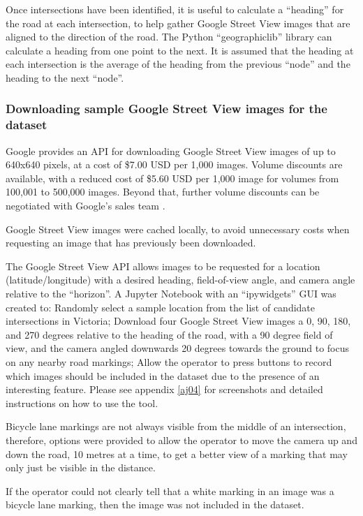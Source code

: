 \documentclass[11pt,twoside]{report}
\begin{document}
Once intersections have been identified, it is useful to calculate a ``heading'' for the road at each intersection, to help gather Google Street View images that are aligned to the direction of the road.  The Python ``geographiclib'' library can calculate a heading from one point to the next.  It is assumed that the heading at each intersection is the average of the heading from the previous ``node'' and the heading to the next ``node''.


\subsubsection{Downloading sample Google Street View images for the dataset}
\label{s:sample}

Google provides an API for downloading Google Street View images of up to 640x640 pixels, at a cost of \$7.00 USD per 1,000 images.  Volume discounts are available, with a reduced cost of \$5.60 USD per 1,000 image for volumes from 100,001 to 500,000 images.  Beyond that, further volume discounts can be negotiated with Google's sales team \cite{gsv_billing}.

Google Street View images were cached locally, to avoid unnecessary costs when requesting an image that has previously been downloaded.

The Google Street View API allows images to be requested for a location (latitude/longitude) with a desired heading, field-of-view angle, and camera angle relative to the ``horizon''.  A Jupyter Notebook with an ``ipywidgets'' GUI was created to:  Randomly select a sample location from the list of candidate intersections in Victoria; Download four Google Street View images a 0, 90, 180, and 270 degrees relative to the heading of the road, with a 90 degree field of view, and the camera angled downwards 20 degrees towards the ground to focus on any nearby road markings;  Allow the operator to press buttons to record which images should be included in the dataset due to the presence of an interesting feature.  Please see appendix \ref{aj04} for screenshots and detailed instructions on how to use the tool.

Bicycle lane markings are not always visible from the middle of an intersection, therefore, options were provided to allow the operator to move the camera up and down the road, 10 metres at a time, to get a better view of a marking that may only just be visible in the distance.

If the operator could not clearly tell that a white marking in an image was a bicycle lane marking, then the image was not included in the dataset.
\end{document}
